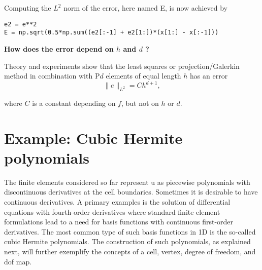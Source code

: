 \documentclass[../main.tex]{subfiles}
\begin{document}
Computing the $L^{2}$ norm of the error, here named E, is now achieved by
\begin{lstlisting}[numbers=none]
e2 = e**2
E = np.sqrt(0.5*np.sum((e2[:-1] + e2[1:])*(x[1:] - x[:-1]))	
\end{lstlisting}
\begin{mybox}
	\textbf{How does the error depend on $h$ and $d$ ?}
	
	\noindent Theory and experiments show that the least squares or projection/Galerkin method in combination with $\mathrm{P} d$ elements of equal length $h$ has an error
	\begin{equation}\label{eqa93}
		\|e\|_{L^{2}}=C h^{d+1},
	\end{equation}
	
	\noindent where $C$ is a constant depending on $f$, but not on $h$ or $d$.
\end{mybox}

\section[Example: Cubic Hermite polynomials]{Example: Cubic Hermite polynomials}
\label{sec:sec_6_5}
The finite elements considered so far represent u as piecewise polynomials with
discontinuous derivatives at the cell boundaries. Sometimes it is desirable to
have continuous derivatives. A primary examples is the solution of differential
equations with fourth-order derivatives where standard finite element formulations lead to a need for basis functions with continuous first-order derivatives.
The most common type of such basis functions in 1D is the so-called cubic
Hermite polynomials. The construction of such polynomials, as explained next,
will further exemplify the concepts of a cell, vertex, degree of freedom, and dof
map.
\end{document}
